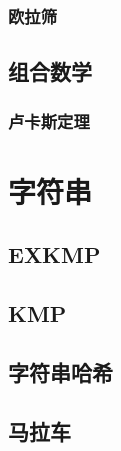 \documentclass{article}
\begin{document}
\begin{multicols*}{2}
\subsubsection{欧拉筛}
\begin{small}

\end{small}

\subsection{组合数学}
\subsubsection{卢卡斯定理}
\begin{small}

\end{small}

\section{字符串}
\subsection{EXKMP}
\begin{small}

\end{small}

\subsection{KMP}
\begin{small}

\end{small}

\subsection{字符串哈希}
\begin{small}

\end{small}

\subsection{马拉车}
\begin{small}

\end{small}


\end{multicols*}
\end{document}
